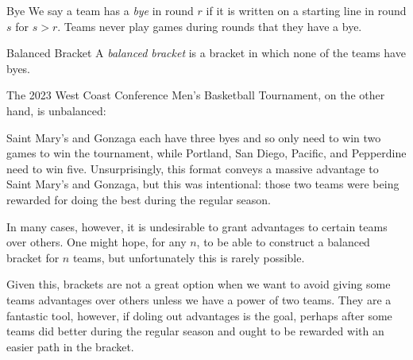 {\begin{definition}{Bye}{}
    We say a team has a \textit{bye} in round $r$ if it is written on a starting line in round $s$ for $s > r.$ Teams never play games during rounds that they have a bye.
\end{definition}

\begin{definition}{Balanced Bracket}{}
    A \textit{balanced bracket} is a bracket in which none of the teams have byes.
\end{definition} 

The 2023 West Coast Conference Men's Basketball Tournament, on the other hand, is unbalanced:

Saint Mary's and Gonzaga each have three byes and so only need to win two games to win the tournament, while Portland, San Diego, Pacific, and Pepperdine need to win five. Unsurprisingly, this format conveys a massive advantage to Saint Mary's and Gonzaga, but this was intentional: those two teams were being rewarded for doing the best during the regular season.

In many cases, however, it is undesirable to grant advantages to certain teams over others. One might hope, for any $n$, to be able to construct a balanced bracket for $n$ teams, but unfortunately this is rarely possible.


Given this, brackets are not a great option when we want to avoid giving some teams advantages over others unless we have a power of two teams. They are a fantastic tool, however, if doling out advantages is the goal, perhaps after some teams did better during the regular season and ought to be rewarded with an easier path in the bracket.
}